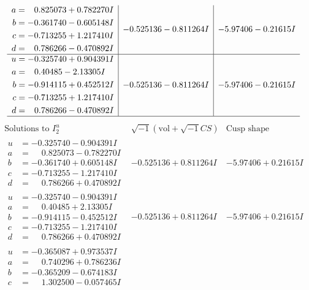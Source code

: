 \documentclass[1p]{elsarticle_modified}
\theoremstyle{definition}
\newcommand{\I}{\sqrt{-1}}
\begin{document}
$$\begin{array}{c|c|c}
\begin{aligned}
a &= \phantom{-}0.825073 + 0.782270 I \\
b &= -0.361740 - 0.605148 I \\
c &= -0.713255 + 1.217410 I \\
d &= \phantom{-}0.786266 - 0.470892 I\end{aligned}
 & -0.525136 - 0.811264 I & -5.97406 - 0.21615 I \\ \hline\begin{aligned}
u &= -0.325740 + 0.904391 I \\
a &= \phantom{-}0.40485 - 2.13305 I \\
b &= -0.914115 + 0.452512 I \\
c &= -0.713255 + 1.217410 I \\
d &= \phantom{-}0.786266 - 0.470892 I\end{aligned}
 & -0.525136 - 0.811264 I & -5.97406 - 0.21615 I\\
 \hline 
 \end{array}$$\newpage$$\begin{array}{c|c|c}  
\text{Solutions to }I^u_{2}& \I (\text{vol} + \sqrt{-1}CS) & \text{Cusp shape}\\
 \hline 
\begin{aligned}
u &= -0.325740 - 0.904391 I \\
a &= \phantom{-}0.825073 - 0.782270 I \\
b &= -0.361740 + 0.605148 I \\
c &= -0.713255 - 1.217410 I \\
d &= \phantom{-}0.786266 + 0.470892 I\end{aligned}
 & -0.525136 + 0.811264 I & -5.97406 + 0.21615 I \\ \hline\begin{aligned}
u &= -0.325740 - 0.904391 I \\
a &= \phantom{-}0.40485 + 2.13305 I \\
b &= -0.914115 - 0.452512 I \\
c &= -0.713255 - 1.217410 I \\
d &= \phantom{-}0.786266 + 0.470892 I\end{aligned}
 & -0.525136 + 0.811264 I & -5.97406 + 0.21615 I \\ \hline\begin{aligned}
u &= -0.365087 + 0.973537 I \\
a &= \phantom{-}0.740296 + 0.786236 I \\
b &= -0.365209 - 0.674183 I \\
c &= \phantom{-}1.302500 - 0.057465 I \\

\end{aligned}
\end{array}$$
\end{document}
